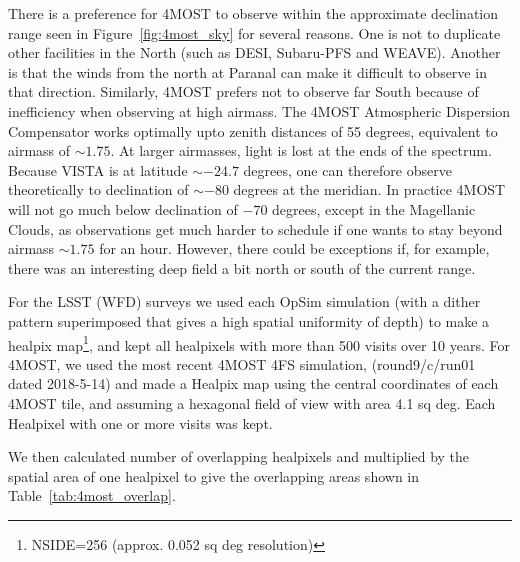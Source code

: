 \documentclass[a4paper,10pt]{article}
\begin{document}
There is a preference for 4MOST to observe within the approximate
declination range seen in Figure~\ref{fig:4most_sky} for several
reasons. One is not to duplicate other facilities in the North (such
as DESI, Subaru-PFS and WEAVE). Another is that the winds from the
north at Paranal can make it difficult to observe in that
direction. Similarly, 4MOST prefers not to observe far South because
of inefficiency when observing at high airmass. The 4MOST Atmospheric
Dispersion Compensator works optimally upto zenith distances of 55
degrees, equivalent to airmass of $\sim1.75$. At larger airmasses,
light is lost at the ends of the spectrum. Because VISTA is at
latitude $\sim -24.7$ degrees, one can therefore observe theoretically
to declination of $\sim -80$ degrees at the meridian. In practice
4MOST will not go much below declination of $-70$ degrees, except in
the Magellanic Clouds, as observations get much harder to schedule if
one wants to stay beyond airmass $\sim 1.75$ for an hour. However,
there could be exceptions if, for example, there was an interesting
deep field a bit north or south of the current range.

For the LSST (WFD) surveys we used each OpSim simulation (with a dither
pattern superimposed that gives a high spatial uniformity of depth) to
make a healpix map\footnote{NSIDE=256 (approx. 0.052 sq deg resolution)}, and kept all healpixels with more than 500 visits
over 10 years. For 4MOST, we used the most recent 4MOST 4FS simulation,
(round9/c/run01 dated 2018-5-14) and made a Healpix map using the
central coordinates of each 4MOST tile, and assuming a hexagonal field
of view with area 4.1 sq deg. Each Healpixel with one or more visits
was kept.
 

We then calculated number of overlapping healpixels and multiplied by the
spatial area of one healpixel to give the overlapping areas shown in
Table~\ref{tab:4most_overlap}.
\end{document}
